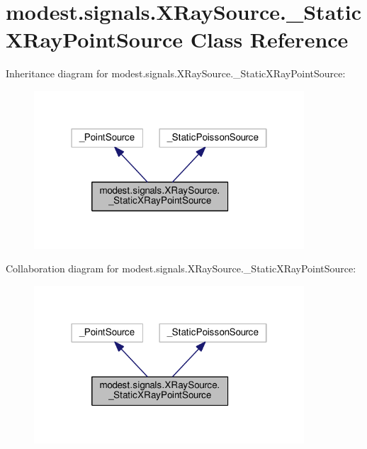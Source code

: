 \hypertarget{classmodest_1_1signals_1_1XRaySource_1_1__StaticXRayPointSource}{}\section{modest.\+signals.\+X\+Ray\+Source.\+\_\+\+Static\+X\+Ray\+Point\+Source Class Reference}
\label{classmodest_1_1signals_1_1XRaySource_1_1__StaticXRayPointSource}


Inheritance diagram for modest.\+signals.\+X\+Ray\+Source.\+\_\+\+Static\+X\+Ray\+Point\+Source\+:
\nopagebreak
\begin{figure}[H]
\begin{center}
\leavevmode
\includegraphics[width=286pt]{classmodest_1_1signals_1_1XRaySource_1_1__StaticXRayPointSource__inherit__graph}
\end{center}
\end{figure}


Collaboration diagram for modest.\+signals.\+X\+Ray\+Source.\+\_\+\+Static\+X\+Ray\+Point\+Source\+:
\nopagebreak
\begin{figure}[H]
\begin{center}
\leavevmode
\includegraphics[width=286pt]{classmodest_1_1signals_1_1XRaySource_1_1__StaticXRayPointSource__coll__graph}
\end{center}
\end{figure}
